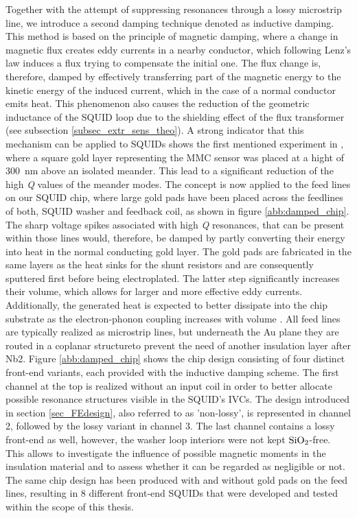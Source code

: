 Together with the attempt of suppressing resonances through a lossy microstrip line, we introduce a second damping technique denoted as inductive damping. This method is based on the principle of magnetic damping, where a change in magnetic flux creates eddy currents in a nearby conductor, which following Lenz's law induces a flux trying to compensate the initial one. The flux change is, therefore, damped by effectively transferring part of the magnetic energy to the kinetic energy of the induced current, which in the case of a normal conductor emits heat. This phenomenon also causes the reduction of the geometric inductance of the SQUID loop due to the shielding effect of the flux transformer (see subsection \ref{subsec_extr_sens_theo}). A strong indicator that this mechanism can be applied to SQUIDs shows the first mentioned experiment in \cite{Boyd2022}, where a square gold layer representing the MMC sensor was placed at a hight of \qty{300}{\nano\meter} above an isolated meander. This lead to a significant reduction of the high \textit{Q} values of the meander modes. The concept is now applied to the feed lines on our SQUID chip, where large gold pads have been placed across the feedlines of both, SQUID washer and feedback coil, as shown in figure \ref{abb:damped_chip}. The sharp voltage spikes associated with high \textit{Q} resonances, that can be present within those lines would, therefore, be damped by partly converting their energy into heat in the normal conducting gold layer. The gold pads are fabricated in the same layers as the heat sinks for the shunt resistors and are consequently sputtered first before being electroplated. The latter step significantly increases their volume, which allows for larger and more effective eddy currents. Additionally, the generated heat is expected to better dissipate into the chip substrate as the electron-phonon coupling increases with volume \cite{Wellstood1994}. All feed lines are typically realized as microstrip lines, but underneath the Au plane they are routed in a coplanar structureto prevent the need of another insulation layer after Nb2. Figure \ref{abb:damped_chip} shows the chip design consisting of four distinct front-end variants, each provided with the inductive damping scheme. The first channel at the top is realized without an input coil in order to better allocate possible resonance structures visible in the SQUID's IVCs. The design introduced in section \ref{sec_FEdesign}, also referred to as 'non-lossy', is represented in channel 2, followed by the lossy variant in channel 3. The last channel contains a lossy front-end as well, however, the washer loop interiors were not kept $\rm SiO_2$-free. This allows to investigate the influence of possible magnetic moments in the insulation material and to assess whether it can be regarded as negligible or not. The same chip design has been produced with and without gold pads on the feed lines, resulting in 8 different front-end SQUIDs that were developed and tested within the scope of this thesis.     

